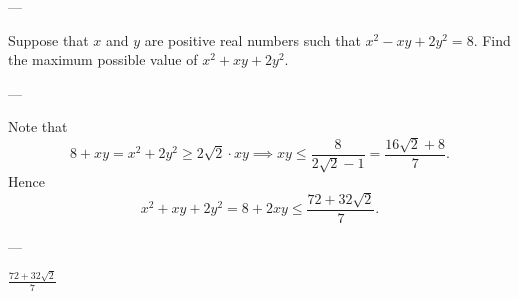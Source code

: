 
---

Suppose that $x$ and $y$ are positive real numbers such that $x^2-xy+2y^2=8$. Find the maximum possible value of $x^2+xy+2y^2$.

---

Note that \[8+xy=x^2+2y^2\ge2\sqrt2\cdot xy\implies xy\le\frac8{2\sqrt2-1}=\frac{16\sqrt2+8}7.\]
Hence \[x^2+xy+2y^2=8+2xy\le\frac{72+32\sqrt2}7.\]

---

$\frac{72+32\sqrt2}7$
